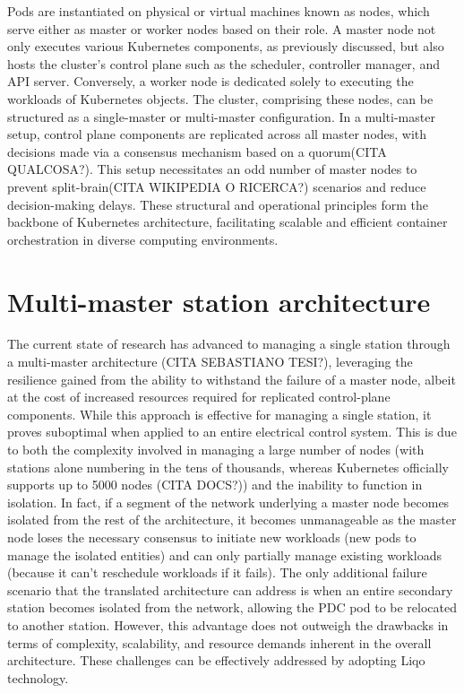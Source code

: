 Pods are instantiated on physical or virtual machines known as nodes, which serve either as master or worker nodes based on their role. A master node not only executes various Kubernetes components, as previously discussed, but also hosts the cluster's control plane such as the scheduler, controller manager, and API server. Conversely, a worker node is dedicated solely to executing the workloads of Kubernetes objects.
The cluster, comprising these nodes, can be structured as a single-master or multi-master configuration. In a multi-master setup, control plane components are replicated across all master nodes, with decisions made via a consensus mechanism based on a quorum(CITA QUALCOSA?). This setup necessitates an odd number of master nodes to prevent split-brain(CITA WIKIPEDIA O RICERCA?) scenarios and reduce decision-making delays. These structural and operational principles form the backbone of Kubernetes architecture, facilitating scalable and efficient container orchestration in diverse computing environments.

\section{Multi-master station architecture}
The current state of research has advanced to managing a single station through a multi-master architecture (CITA SEBASTIANO TESI?), leveraging the resilience gained from the ability to withstand the failure of a master node, albeit at the cost of increased resources required for replicated control-plane components. While this approach is effective for managing a single station, it proves suboptimal when applied to an entire electrical control system. This is due to both the complexity involved in managing a large number of nodes (with stations alone numbering in the tens of thousands, whereas Kubernetes officially supports up to 5000 nodes (CITA DOCS?)) and the inability to function in isolation. In fact, if a segment of the network underlying a master node becomes isolated from the rest of the architecture, it becomes unmanageable as the master node loses the necessary consensus to initiate new workloads (new pods to manage the isolated entities) and can only partially manage existing workloads (because it can't reschedule workloads if it fails).
The only additional failure scenario that the translated architecture can address is when an entire secondary station becomes isolated from the network, allowing the PDC pod to be relocated to another station. However, this advantage does not outweigh the drawbacks in terms of complexity, scalability, and resource demands inherent in the overall architecture. These challenges can be effectively addressed by adopting Liqo technology.
